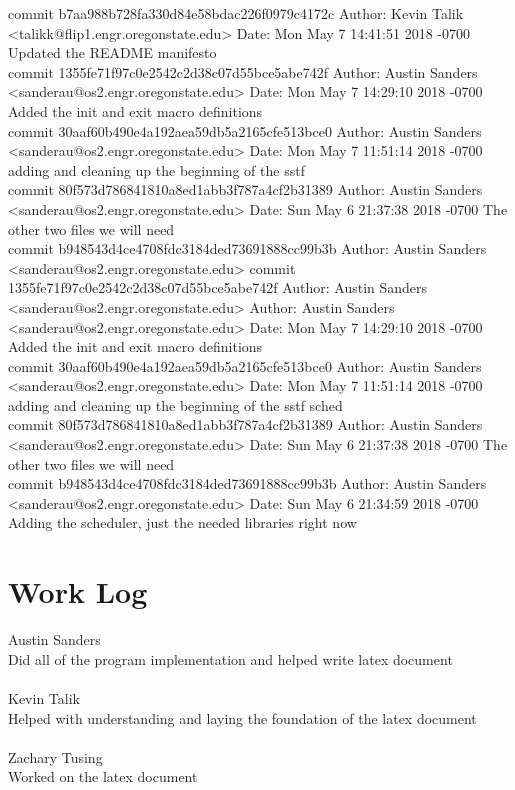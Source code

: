 \documentclass[onecolumn, draftclsnofoot,10pt, compsoc]{IEEEtran}
\begin{document}
{commit b7aa988b728fa330d84e58bdac226f0979c4172c
Author: Kevin Talik <talikk@flip1.engr.oregonstate.edu>
Date:   Mon May 7 14:41:51 2018 -0700
Updated the README manifesto\\

commit 1355fe71f97c0e2542c2d38c07d55bce5abe742f
Author: Austin Sanders <sanderau@os2.engr.oregonstate.edu>
Date:   Mon May 7 14:29:10 2018 -0700
Added the init and exit macro definitions\\

commit 30aaf60b490e4a192aea59db5a2165cfe513bce0
Author: Austin Sanders <sanderau@os2.engr.oregonstate.edu>
Date:   Mon May 7 11:51:14 2018 -0700
adding and cleaning up the beginning of the sstf \\

commit 80f573d786841810a8ed1abb3f787a4cf2b31389
Author: Austin Sanders <sanderau@os2.engr.oregonstate.edu>
Date:   Sun May 6 21:37:38 2018 -0700
The other two files we will need\\

commit b948543d4ce4708fdc3184ded73691888cc99b3b
Author: Austin Sanders <sanderau@os2.engr.oregonstate.edu>
commit 1355fe71f97c0e2542c2d38c07d55bce5abe742f
Author: Austin Sanders <sanderau@os2.engr.oregonstate.edu>
Author: Austin Sanders <sanderau@os2.engr.oregonstate.edu>
Date:   Mon May 7 14:29:10 2018 -0700
Added the init and exit macro definitions\\

commit 30aaf60b490e4a192aea59db5a2165cfe513bce0
Author: Austin Sanders <sanderau@os2.engr.oregonstate.edu>
Date:   Mon May 7 11:51:14 2018 -0700
adding and cleaning up the beginning of the sstf sched\\

commit 80f573d786841810a8ed1abb3f787a4cf2b31389
Author: Austin Sanders <sanderau@os2.engr.oregonstate.edu>
Date:   Sun May 6 21:37:38 2018 -0700
The other two files we will need\\

commit b948543d4ce4708fdc3184ded73691888cc99b3b
Author: Austin Sanders <sanderau@os2.engr.oregonstate.edu>
Date:   Sun May 6 21:34:59 2018 -0700
Adding the scheduler, just the needed libraries right now\\
}

\section{Work Log}

Austin Sanders\\ 
Did all of the program implementation and helped write latex document\\
\\
Kevin Talik\\
Helped with understanding and laying the foundation of the latex document\\
\\
Zachary Tusing\\
Worked on the latex document
\\

		
        
        
        
\end{document}
